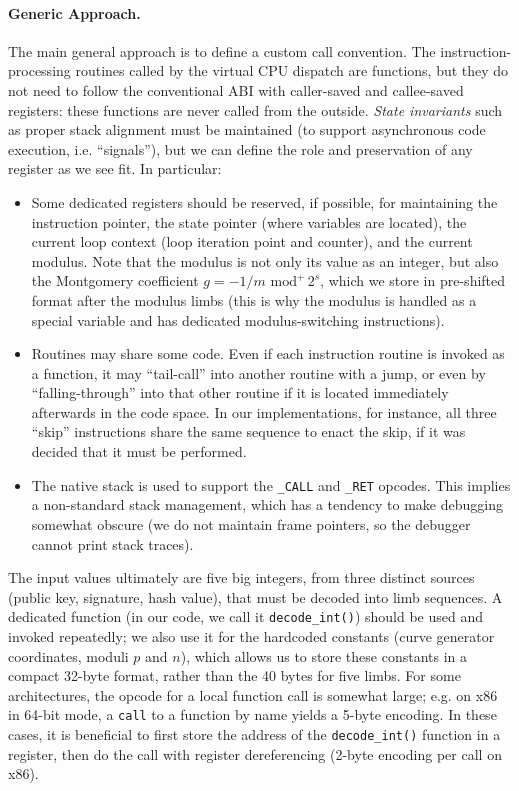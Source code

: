 \documentclass{llncs}
\newcommand{\umod}[2]{#1 \,\,\text{mod}^{+}\, #2}
\begin{document}
\paragraph{Generic Approach.}
The main general approach is to define a custom call convention. The
instruction-processing routines called by the virtual CPU dispatch are
functions, but they do not need to follow the conventional ABI with
caller-saved and callee-saved registers: these functions are never
called from the outside. \emph{State invariants} such as proper stack
alignment must be maintained (to support asynchronous code execution,
i.e. ``signals''), but we can define the role and preservation of any
register as we see fit. In particular:
\begin{itemize}

    \item Some dedicated registers should be reserved, if possible, for
    maintaining the instruction pointer, the state pointer (where
    variables are located), the current loop context (loop iteration
    point and counter), and the current modulus. Note that the modulus
    is not only its value as an integer, but also the Montgomery
    coefficient $g = \umod{-1/m}{2^s}$, which we store in pre-shifted
    format after the modulus limbs (this is why the modulus is handled
    as a special variable and has dedicated modulus-switching
    instructions).

    \item Routines may share some code. Even if each instruction routine
    is invoked as a function, it may ``tail-call'' into another routine
    with a jump, or even by ``falling-through'' into that other routine
    if it is located immediately afterwards in the code space. In
    our implementations, for instance, all three ``skip'' instructions
    share the same sequence to enact the skip, if it was decided that it
    must be performed.

    \item The native stack is used to support the \verb+_CALL+ and
    \verb+_RET+ opcodes. This implies a non-standard stack management,
    which has a tendency to make debugging somewhat obscure (we do not
    maintain frame pointers, so the debugger cannot print stack traces).

\end{itemize}

The input values ultimately are five big integers, from three distinct
sources (public key, signature, hash value), that must be decoded into
limb sequences. A dedicated function (in our code, we call it
\verb+decode_int()+) should be used and invoked repeatedly; we also use
it for the hardcoded constants (curve generator coordinates, moduli $p$
and $n$), which allows us to store these constants in a compact 32-byte
format, rather than the 40 bytes for five limbs. For some architectures,
the opcode for a local function call is somewhat large; e.g. on x86 in
64-bit mode, a \verb+call+ to a function by name yields a 5-byte
encoding. In these cases, it is beneficial to first store the address of
the \verb+decode_int()+ function in a register, then do the call with
register dereferencing (2-byte encoding per call on x86).
\end{document}
